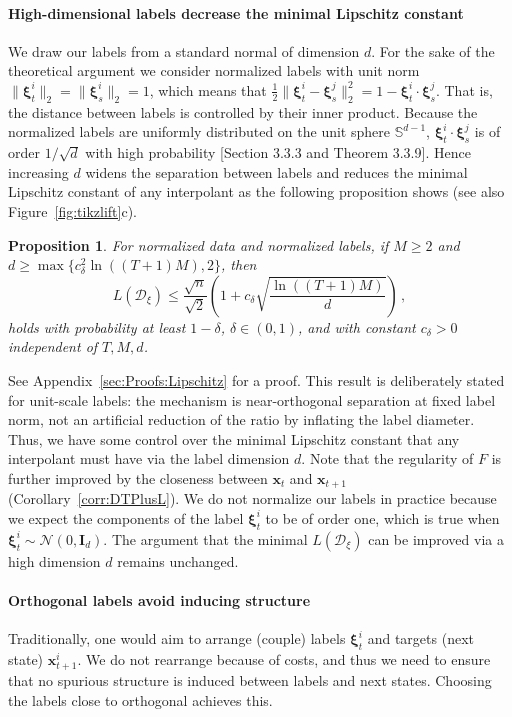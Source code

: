 \documentclass{article}
\theoremstyle{plain}
\newtheorem{proposition}[theorem]{Proposition}
\theoremstyle{definition}
\theoremstyle{remark}
\newcommand{\bfxi}{{\bm \xi}}
\newcommand{\x}{\bm{x}}
\begin{document}
\paragraph{High-dimensional labels decrease the minimal Lipschitz constant}
We draw our labels from a standard normal of dimension $d$.
For the sake of the theoretical argument we consider normalized labels with unit norm $\|\bfxi_t^i\|_2 = \|\bfxi_s^i\|_2= 1$, which means that $ \frac 1 2 \|\bfxi_t^i - \bfxi_s^j\|_2^2 = 1 - \bfxi_t^i \cdot \bfxi_s^j$. That is, the distance between labels is controlled by their  inner product. Because the normalized labels are uniformly distributed on the unit sphere $\mathbb{S}^{d - 1}$, $\bfxi_t^i \cdot \bfxi_s^j$ is of order $1/ \sqrt d$ with high probability \cite{Vershynin2018}[Section 3.3.3 and Theorem 3.3.9]. Hence increasing $d$ widens the separation between labels and reduces the minimal Lipschitz constant of any interpolant as the following proposition shows (see also Figure~\ref{fig:tikzlift}c).

\begin{proposition}\label{prop:LipschitzC}
  For normalized data and normalized labels, if $M \geq 2$ and $d \geq \max\{c_{\delta}^2\ln((T + 1)M), 2\}$, then
  \[
    L(\mathcal{D}_{\xi}) \leq \frac{\sqrt{n}}{\sqrt{2}}\left(1 + c_{\delta}\sqrt{\frac{\ln((T + 1)M)}{d}}\right)\,,
  \]
  holds with probability at least $1 - \delta$, $\delta \in (0, 1)$, and with constant $c_{\delta} > 0$  independent of $T, M, d$.
\end{proposition}
See  Appendix~\ref{sec:Proofs:Lipschitz} for a proof.
This result is deliberately stated for unit-scale labels: the mechanism is near-orthogonal separation at fixed label norm, not an artificial reduction of the ratio by inflating the label diameter. 
Thus, we have some control over the minimal Lipschitz constant that any interpolant must have via the label dimension $d$. Note that the regularity of $F$ is further improved by the closeness between $\x_t$ and $\x_{t+1}$ (Corollary~\ref{corr:DTPlusL}). We do not normalize our labels in practice because we expect the components of the label $\bfxi_t^i$ to be of order one, which is true when $\bfxi_t^i \sim \mathcal N(0, \boldsymbol{I}_d)$. The argument that the minimal $L(\mathcal D_\xi)$ can be improved via a high dimension $d$ remains unchanged.

\paragraph{Orthogonal labels avoid inducing structure}
Traditionally, one would aim to arrange (couple) labels $\bfxi_t^i$ and targets (next state) $\x_{t+1}^i$. We do not rearrange because of costs, and thus we need to ensure that no spurious structure is induced between labels and next states. Choosing the labels close to orthogonal achieves this.
\end{document}

